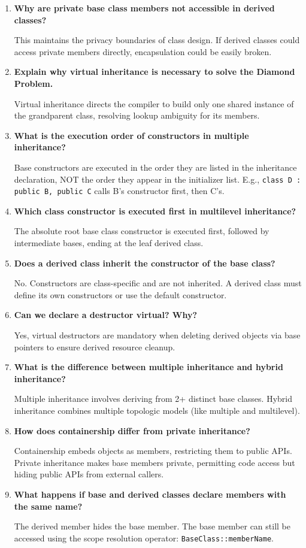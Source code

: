 \documentclass[12pt,a4paper]{article}
\newcommand{\Q}[1]{\textbf{#1}\par\noindent\ignorespaces}
\begin{document}
\begin{tcolorbox}[exambox, title={\textbf{Frequently Asked / Viva Questions}}]
\begin{enumerate}[topsep=0pt, label=\textbf{Q\arabic*.}, itemsep=5pt]
  \item \Q{Why are private base class members not accessible in derived classes?}
    This maintains the privacy boundaries of class design. If derived classes could access private members directly, encapsulation could be easily broken.
  \item \Q{Explain why virtual inheritance is necessary to solve the Diamond Problem.}
    Virtual inheritance directs the compiler to build only one shared instance of the grandparent class, resolving lookup ambiguity for its members.
  \item \Q{What is the execution order of constructors in multiple inheritance?}
    Base constructors are executed in the order they are listed in the inheritance declaration, NOT the order they appear in the initializer list. E.g., \texttt{class D : public B, public C} calls B's constructor first, then C's.
  \item \Q{Which class constructor is executed first in multilevel inheritance?}
    The absolute root base class constructor is executed first, followed by intermediate bases, ending at the leaf derived class.
  \item \Q{Does a derived class inherit the constructor of the base class?}
    No. Constructors are class-specific and are not inherited. A derived class must define its own constructors or use the default constructor.
  \item \Q{Can we declare a destructor virtual? Why?}
    Yes, virtual destructors are mandatory when deleting derived objects via base pointers to ensure derived resource cleanup.
  \item \Q{What is the difference between multiple inheritance and hybrid inheritance?}
    Multiple inheritance involves deriving from 2+ distinct base classes. Hybrid inheritance combines multiple topologic models (like multiple and multilevel).
  \item \Q{How does containership differ from private inheritance?}
    Containership embeds objects as members, restricting them to public APIs. Private inheritance makes base members private, permitting code access but hiding public APIs from external callers.
  \item \Q{What happens if base and derived classes declare members with the same name?}
    The derived member hides the base member. The base member can still be accessed using the scope resolution operator: \texttt{BaseClass::memberName}.

\end{enumerate}
\end{tcolorbox}
\end{document}
